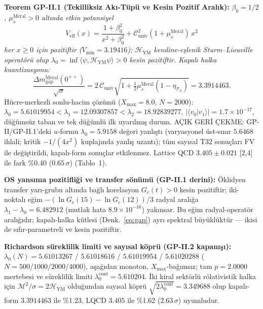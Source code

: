 \documentclass[12pt,a4paper]{article}
\begin{document}
\textbf{Teorem GP-II.1 (Tekilliksiz Akı-Tüpü ve Kesin Pozitif Aralık):}
\textit{$\beta_0=1/2$, $\mu_s^{\mathrm{Meral}}>0$ altında etkin potansiyel}
\begin{equation}
\label{eq:veff}
\boxed{V_{\mathrm{eff}}(x)=\frac{1+\beta_0^2}{x^2+\beta_0^2}
+\mathcal{C}_{\mathrm{univ}}^2(1+\mu_s^{\mathrm{Meral}})\,x^2}
\end{equation}
\textit{her $x\ge 0$ için pozitiftir ($V_{\min}=3.19416$); $\mathcal{H}_{\mathrm{YM}}$
kendine-eşlenik Sturm--Liouville operatörü olup
$\lambda_0=\inf\langle\psi,\mathcal{H}_{\mathrm{YM}}\psi\rangle>0$ kesin
pozitiftir. Kapalı halka kuantizasyonu:}
\begin{equation}
\label{eq:gap}
\boxed{\frac{\Delta m_{\mathrm{gap}}^{\mathrm{Meral}}(0^{++})}{\sqrt{\sigma}}
=2\,\mathcal{C}_{\mathrm{univ}}\sqrt{1+\tfrac{1}{2}\mu_s^{\mathrm{Meral}}
(1-\eta_{\mathcal{T}_0})}=3.3914463.}
\end{equation}
Hücre-merkezli sonlu-hacim çözümü ($X_{\max}=8.0$, $N=2000$):
$\lambda_0=5.61019954<\lambda_1=12.09307857<\lambda_2=18.92839277$,
$|\langle v_0|v_1\rangle|=1.7\times 10^{-17}$, düğümsüz taban ve tek
düğümlü ilk uyarılmış durum. AÇIK GERİ ÇEKME: GP-II/GP-II.1'deki
$u$-formu $\lambda_0=5.9158$ değeri yanlıştı (varyasyonel üst-sınır
$5.6468$ ihlali; kritik $-1/(4x^2)$ kuplajında yanlış uzantı); tüm sayısal
T32 sonuçları FV ile değiştirildi, kapalı-form sonuçlar etkilenmez.
Lattice QCD $3.405\pm 0.021$ [2,4] ile fark \%0.40 ($0.65\,\sigma$) (Tablo~1).

\textbf{OS yansıma pozitifliği ve transfer sönümü (GP-II.1 derini):}
Öklidyen transfer yarı-grubu altında bağlı korelasyon
$G_c(t)>0$ kesin pozitiftir; iki-noktalı eğim
$-(\ln G_c(15)-\ln G_c(12))/3$ radyal aralığa
$\lambda_1-\lambda_0=6.482912$ (mutlak hata $8.9\times 10^{-16}$) yakınsar.
Bu eğim radyal-operatör aralığıdır; kapalı-halka kütlesi (Denk.~\ref{eq:gap})
ayrı spektral büyüklüktür --- ikisi de sıfır-parametreli ve kesin pozitiftir.

\textbf{Richardson süreklilik limiti ve sayısal köprü (GP-II.2 kapanışı):}
$\lambda_0(N)=5.61013267$ / $5.61018616$ / $5.61019954$ / $5.61020288$
($N=500/1000/2000/4000$), aşağıdan monoton, $X_{\max}$-bağımsız; tam
$p=2.0000$ mertebesi ve süreklilik limiti
$\lambda_0^{\mathrm{cont}}=5.610204$. İki kiral sektörlü rölativistik halka
için $\mathcal{M}^2/\sigma=2\mathcal{H}_{\mathrm{YM}}$ olduğundan sayısal
köprü $\sqrt{2\lambda_0^{\mathrm{cont}}}=3.349688$ olup kapalı-form
$3.3914463$ ile \%1.23, LQCD $3.405$ ile \%1.62 ($2.63\,\sigma$) uyumludur.
\end{document}

